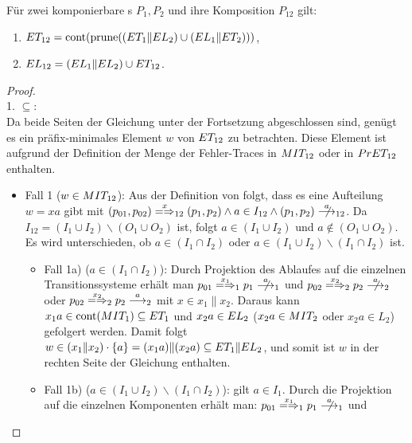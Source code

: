 \begin{Satz}
  \label{KommFehlerSemSatz}
  Für zwei komponierbare \MEIO{}s $P_1,P_2$ und ihre Komposition $P_{12}$ gilt:
  \begin{enumerate}
    \item $ET _{12} = \mathrm{cont} (\mathrm{prune} ((ET _1\|EL _2) \cup (EL _1\|ET
      _2)))$,
    \item $EL _{12} = (EL _1\|EL _2) \cup ET _{12}$.
  \end{enumerate}
\end{Satz}
\begin{proof}\mbox{}\\
  1. \glqq$\subseteq$\grqq{}:\\
  Da beide Seiten der Gleichung unter der Fortsetzung \cont{} abgeschlossen
  sind, genügt es ein präfix-minimales Element $w$ von $ET _{12}$ zu
  betrachten. Diese Element ist aufgrund der Definition der Menge der
  Fehler-Traces in $MIT _{12}$ oder in $PrET _{12}$ enthalten.
  \begin{itemize}
    \item Fall 1 ($w\in MIT _{12}$): Aus der Definition von \MIT{} folgt, dass
      es eine Aufteilung $w=xa$ gibt mit $(p_{01},p_{02}) \weakmay[x]_{12}
      (p_1,p_2) \land a \in I_{12} \land (p_1,p_2) \nmust[a]_{12}$. Da $I_{12}
      = (I_1\cup I_2) \backslash (O_1\cup O_2)$ ist, folgt $a\in (I_1\cup I_2)$
      und $a\notin (O_1\cup O_2)$. Es wird unterschieden, ob $a\in (I_1\cap
      I_2)$ oder $a\in (I_1\cup I_2) \backslash (I_1\cap I_2)$ ist.
    \begin{itemize}
      \item Fall 1a) ($a\in (I_1\cap I_2)$): Durch Projektion des Ablaufes auf
        die einzelnen Transitionssysteme erhält man \oBdA{}
        $p_{01}\weakmay[x_1]_1 p_1\nmust[a]_1$ und $p_{02}\weakmay[x_2]_2
        p_2\nmust[a]_2$ oder $p_{02}\weakmay[x_2]_2 p_2\must[a]_2$ mit $x\in
        x_1\|x_2$. Daraus kann $x_1a\in \mathrm{cont} (MIT _1) \subseteq ET _1$ und
        $x_2a\in EL _2$ ($x_2a\in MIT _2$ oder $x_2a \in L_2$) gefolgert
        werden. Damit folgt $w\in (x_1\|x_2) \cdot \{a\} =
        (x_1a)\|(x_2a)\subseteq ET _1\|EL _2$, und somit ist $w$ in der
        rechten Seite der Gleichung enthalten.
      \item Fall 1b) ($a\in (I_1\cup I_2)\backslash (I_1\cap I_2)$): \OBdA{}
        gilt $a\in I_1$. Durch die Projektion auf die einzelnen Komponenten
        erhält man: $p_{01}\weakmay[x_1]_1 p_1\nmust[a]_1$ und

\end{itemize}
\end{itemize}
\end{proof}

